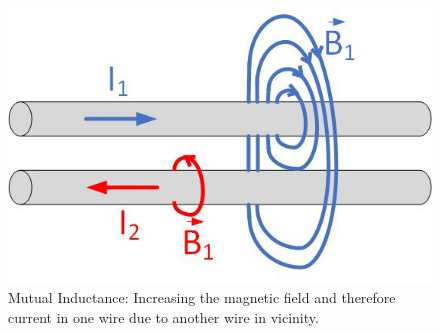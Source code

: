 \documentclass{ximera}
\begin{document}
\begin{figure}[htbp]
\begin{center}
\includegraphics[scale=0.5]{../jpg/inductanceCurrentOppoDir1.jpg}
\end{center}
\caption{Mutual Inductance: Increasing the magnetic field and therefore current in one wire due to another wire in vicinity. }
\label{MutualInduc1}
\end{figure}
\end{document}
